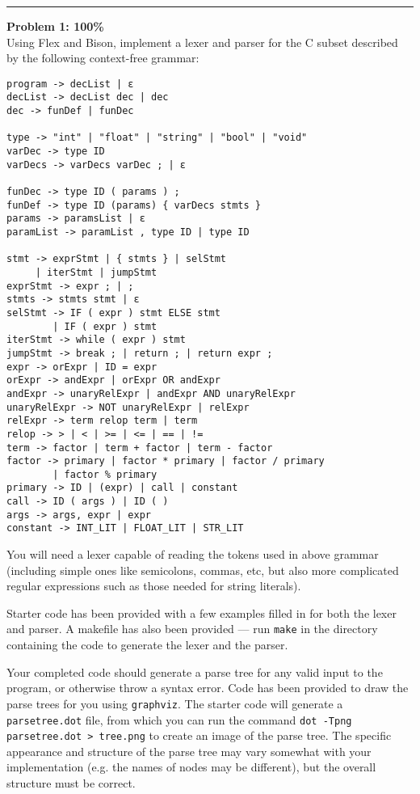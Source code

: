 \documentclass[a4paper, 11pt]{article}
\newenvironment{problem}[2][Problem]
    { \begin{mdframed}[backgroundcolor=gray!20] \textbf{#1 #2} \\}
    {  \end{mdframed}}
\begin{document}
\noindent\rule{7in}{2.8pt}
\begin{problem}{1: 100\%}
  Using Flex and Bison, implement a lexer and parser for the C subset described by the following context-free grammar:

\begin{verbatim}
program -> decList | ε
decList -> decList dec | dec
dec -> funDef | funDec

type -> "int" | "float" | "string" | "bool" | "void"
varDec -> type ID
varDecs -> varDecs varDec ; | ε

funDec -> type ID ( params ) ;
funDef -> type ID (params) { varDecs stmts }
params -> paramsList | ε
paramList -> paramList , type ID | type ID

stmt -> exprStmt | { stmts } | selStmt
     | iterStmt | jumpStmt
exprStmt -> expr ; | ;
stmts -> stmts stmt | ε
selStmt -> IF ( expr ) stmt ELSE stmt
       	| IF ( expr ) stmt
iterStmt -> while ( expr ) stmt
jumpStmt -> break ; | return ; | return expr ;
expr -> orExpr | ID = expr
orExpr -> andExpr | orExpr OR andExpr
andExpr -> unaryRelExpr | andExpr AND unaryRelExpr
unaryRelExpr -> NOT unaryRelExpr | relExpr
relExpr -> term relop term | term
relop -> > | < | >= | <= | == | !=
term -> factor | term + factor | term - factor
factor -> primary | factor * primary | factor / primary
    	| factor % primary
primary -> ID | (expr) | call | constant
call -> ID ( args ) | ID ( )
args -> args, expr | expr
constant -> INT_LIT | FLOAT_LIT | STR_LIT
\end{verbatim}

  You will need a lexer capable of reading the tokens used in above grammar (including simple ones like semicolons, commas, etc, but also more complicated regular expressions such as those needed for string literals).\par
  Starter code has been provided with a few examples filled in for both the lexer and parser. A makefile has also been provided --- run \verb|make| in the directory containing the code to generate the lexer and the parser.\par
  Your completed code should generate a parse tree for any valid input to the program, or otherwise throw a syntax error. Code has been provided to draw the parse trees for you using \verb|graphviz|. The starter code will generate a \verb|parsetree.dot| file, from which you can run the command \texttt{dot -Tpng parsetree.dot > tree.png} to create an image of the parse tree. The specific appearance and structure of the parse tree may vary somewhat with your implementation (e.g. the names of nodes may be different), but the overall structure must be correct.\par
\end{problem}
\end{document}
